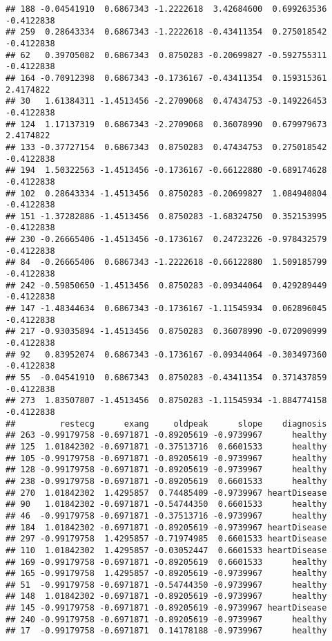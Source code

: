 \documentclass[
]{article}
\begin{document}
\begin{verbatim}
## 188 -0.04541910  0.6867343 -1.2222618  3.42684600  0.699263536 -0.4122838
## 259  0.28643334  0.6867343 -1.2222618 -0.43411354  0.275018542 -0.4122838
## 62   0.39705082  0.6867343  0.8750283 -0.20699827 -0.592755311 -0.4122838
## 164 -0.70912398  0.6867343 -0.1736167 -0.43411354  0.159315361  2.4174822
## 30   1.61384311 -1.4513456 -2.2709068  0.47434753 -0.149226453 -0.4122838
## 124  1.17137319  0.6867343 -2.2709068  0.36078990  0.679979673  2.4174822
## 133 -0.37727154  0.6867343  0.8750283  0.47434753  0.275018542 -0.4122838
## 194  1.50322563 -1.4513456 -0.1736167 -0.66122880 -0.689174628 -0.4122838
## 102  0.28643334 -1.4513456  0.8750283 -0.20699827  1.084940804 -0.4122838
## 151 -1.37282886 -1.4513456  0.8750283 -1.68324750  0.352153995 -0.4122838
## 230 -0.26665406 -1.4513456 -0.1736167  0.24723226 -0.978432579 -0.4122838
## 84  -0.26665406  0.6867343 -1.2222618 -0.66122880  1.509185799 -0.4122838
## 242 -0.59850650 -1.4513456  0.8750283 -0.09344064  0.429289449 -0.4122838
## 147 -1.48344634  0.6867343 -0.1736167 -1.11545934  0.062896045 -0.4122838
## 217 -0.93035894 -1.4513456  0.8750283  0.36078990 -0.072090999 -0.4122838
## 92   0.83952074  0.6867343 -0.1736167 -0.09344064 -0.303497360 -0.4122838
## 55  -0.04541910  0.6867343  0.8750283 -0.43411354  0.371437859 -0.4122838
## 273  1.83507807 -1.4513456  0.8750283 -1.11545934 -1.884774158 -0.4122838
##         restecg      exang     oldpeak      slope    diagnosis
## 263 -0.99179758 -0.6971871 -0.89205619 -0.9739967      healthy
## 125  1.01842302 -0.6971871 -0.37513716  0.6601533      healthy
## 105 -0.99179758 -0.6971871 -0.89205619 -0.9739967      healthy
## 128 -0.99179758 -0.6971871 -0.89205619 -0.9739967      healthy
## 238 -0.99179758 -0.6971871 -0.89205619  0.6601533      healthy
## 270  1.01842302  1.4295857  0.74485409 -0.9739967 heartDisease
## 90   1.01842302 -0.6971871 -0.54744350  0.6601533      healthy
## 46  -0.99179758 -0.6971871 -0.37513716 -0.9739967      healthy
## 184  1.01842302 -0.6971871 -0.89205619 -0.9739967 heartDisease
## 297 -0.99179758  1.4295857 -0.71974985  0.6601533 heartDisease
## 110  1.01842302  1.4295857 -0.03052447  0.6601533 heartDisease
## 169 -0.99179758 -0.6971871 -0.89205619  0.6601533      healthy
## 165 -0.99179758  1.4295857 -0.89205619 -0.9739967      healthy
## 51  -0.99179758 -0.6971871 -0.54744350 -0.9739967      healthy
## 148  1.01842302 -0.6971871 -0.89205619 -0.9739967      healthy
## 145 -0.99179758 -0.6971871 -0.89205619 -0.9739967 heartDisease
## 240 -0.99179758 -0.6971871 -0.89205619 -0.9739967      healthy
## 17  -0.99179758 -0.6971871  0.14178188 -0.9739967      healthy

\end{verbatim}
\end{document}
